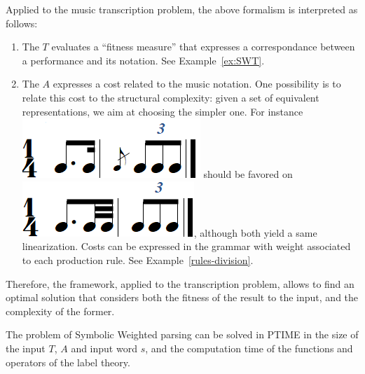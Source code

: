 \begin{example}
Applied to the music transcription problem, the above formalism
is interpreted as follows:
\begin{enumerate}

  \item The \SWT $T$ evaluates a ``fitness measure''  that expresses
    a correspondance between a performance and its notation. See Example~\ref{ex:SWT}.
\item The \SWVPA $A$ expresses a cost related to the music notation. One possibility
 is to relate this cost to the structural complexity: given a set of equivalent
 representations, we aim at choosing the simpler one. For instance
 \includegraphics[scale=0.20]{pictures/score4.png} should be favored
 on \includegraphics[scale=0.20]{pictures/score5.png}, although both yield
 a same linearization. Costs  can be expressed
 in the grammar with weight associated to each production rule. See Example~\ref{rules-division}.

 \end{enumerate}
Therefore, the framework, applied to the transcription problem, allows to find an optimal
solution that considers both the fitness of the result to the input, and the complexity of the former.
\end{example}
%
%
\begin{proposition}
The problem of Symbolic Weighted  parsing
can be solved in PTIME in the size of the input \SWT $T$, \SWVPA $A$
and input word $s$,
and the computation time of the functions and operators of the label theory.
\end{proposition}
%
